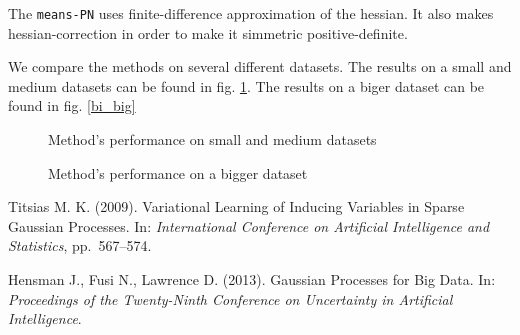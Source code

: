 \documentclass[12pt]{article}
\begin{document}
	The \lstinline{means-PN} uses finite-difference approximation of the hessian. It also makes hessian-correction in order to make it simmetric positive-definite.

	We compare the methods on several different datasets. The results on a small and medium datasets can be found in fig. \ref{vi_small}. The results on a biger dataset can be found in fig. \ref{bi_big}

	\begin{figure}[!h]
		\centering
		\subfloat{
			\scalebox{0.9}{
				
			}
		}
		\subfloat{
			\scalebox{0.9}{
	    		
			}
		}
		\label{vi_small}
		\caption{Method's performance on small and medium datasets}
	\end{figure}
	\begin{figure}[!h]
		\centering
		\subfloat{
			\scalebox{0.9}{
				
			}
		}
		\label{vi_big}
		\caption{Method's performance on a bigger dataset}
	\end{figure}
\pagebreak
\begin{thebibliography}{99}

Titsias M. K. (2009).  Variational Learning of Inducing Variables in Sparse Gaussian
Processes.  In: {\it International Conference on Artificial Intelligence and Statistics}, pp.~567–574.

Hensman J., Fusi N., Lawrence D. (2013).  Gaussian Processes for Big Data.  In: {\it Proceedings of the Twenty-Ninth Conference on Uncertainty in Artificial Intelligence}.

\end{thebibliography}	
\end{document}
